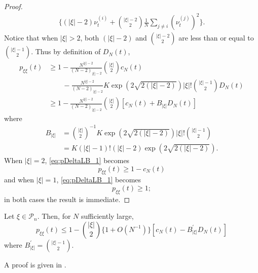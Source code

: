 \begin{proof}
\begin{align*}
        \Bigg\{ ( | \xi | - 2 ) \nu_t^{ ( i ) } + \binom{ | \xi | - 2 }{ 2 } \frac{1}{N} 
        \sum_{ j \neq i } ( \nu_t^{ ( j ) } )^2 \Bigg\} .
\end{align*}
Notice that when $|\xi| > 2$, both $(|\xi|-2)$ and $\binom{|\xi|-2}{2}$ are less than or equal to $\binom{|\xi|-1}{2}$. Thus by definition of $D_N(t)$,
\begin{align*}
p_{ \xi \xi }( t ) 
&\geq 1 - \frac{ N^{ | \xi | - 2 } }{ ( N-2 )_{ | \xi | -2} } \binom{|\xi|}{2}
        c_N(t) \\
    &\qquad- \frac{ N^{|\xi|-2} }{ ( N-2 )_{ | \xi | -2} }
        K \exp( 2 \sqrt{2(|\xi|-2)} ) |\xi|! \binom{ |\xi|-1}{2} D_N(t) \\
&\geq 1 - \frac{ N^{ | \xi | - 2 } }{ ( N-2 )_{ | \xi | -2} } \binom{|\xi|}{2}
        \left[ c_N(t) + B_{|\xi|} D_N(t) \right]
\end{align*}
where
\begin{align*}
B_{|\xi|} 
&= \binom{|\xi|}{2}^{-1} K \exp( 2 \sqrt{2(|\xi|-2)} ) |\xi|! \binom{ |\xi|-1}{2} \\
&= K (|\xi|-1)! (|\xi|-2) \exp( 2 \sqrt{2(|\xi|-2)} ) .
\end{align*}
When $|\xi| = 2$, \eqref{eq:pDeltaLB_1} becomes 
\begin{equation*}
p_{ \xi \xi }( t )
\geq 1 - c_N(t)
\end{equation*}
and when $|\xi| = 1$, 
\eqref{eq:pDeltaLB_1} becomes 
\begin{equation*}
p_{ \xi \xi }( t )
\geq 1 ;
\end{equation*}
in both cases the result is immediate.
\end{proof}


\begin{prop}%
\label{thm:pDelta_UB}
Let $\xi \in \mathcal{P}_n$. Then, for $N$ sufficiently large,
\begin{equation*}
p_{\xi\xi}(t)
\leq 1 - \binom{|\xi|}{2} \{ 1 + O(N^{-1}) \} 
        \left[ c_N(t) - B_{|\xi|}^\prime D_N(t) \right]
\end{equation*}
where $B_{|\xi|}^\prime = \binom{|\xi|-1}{2}$.
\end{prop}

A proof is given in \textcite[Lemma 1 Case 1]{koskela2018}.





